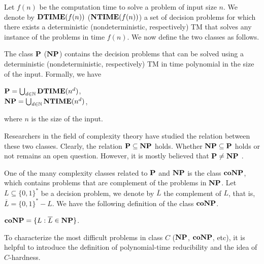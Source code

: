 Let $f(n)$ be the computation time to solve a problem of input size $n$.
We denote by $\textbf{DTIME}(f(n))$ ($\textbf{NTIME}(f(n))$) a set of decision problems 
for which there exists a deterministic (nondeterministic, respectively) TM
that solves any instance of the problems in time $f(n)$.
We now define the two classes as follows.

\begin{definition}
	The class $\textbf{P}$ ($\textbf{NP}$) contains the decision problems that can be solved using a 
	deterministic (nondeterministic, respectively) TM 
	in time polynomial in the size of the input.  Formally, we have
	\begin{center}
		$\textbf{P} = \bigcup_{d \in \mathbb{N}} \textbf{DTIME}(n^d)$,\\
		$\textbf{NP} = \bigcup_{d \in \mathbb{N}} \textbf{NTIME}(n^d)$,
	\end{center}
	where $n$ is the size of the input.
\end{definition}

Researchers in the field of complexity theory have studied
the relation between these two classes.
Clearly, the relation $\textbf{P} \subseteq \textbf{NP}$ holds. Whether
$\textbf{NP} \subseteq \textbf{P}$ holds or not remains an open question.
However, it is mostly believed that $\textbf{P} \not = \textbf{NP}$ \cite{gasarch2002p}. 


One of the many complexity classes related to $\textbf{P}$ and $\textbf{NP}$ \cite{gasarch2002p}
is the class $\textbf{coNP}$, which contains problems that are complement of 
the problems in $\textbf{NP}$.
Let $L \subseteq \{0,1\}^*$ be a decision problem, we denote by $\overline{L}$ the
complement of $L$, that is, $\overline{L} = \{0,1\}^*-L$.
We have the following definition of the class $\textbf{coNP}$.

\begin{definition}
	$\textbf{coNP} = \{L : \overline{L} \in \textbf{NP}\}$.
\end{definition}

To characterize the most difficult problems in class $C$ ($\textbf{NP}$, $\textbf{coNP}$, etc), 
it is helpful to introduce
the definition of polynomial-time reducibility \cite{gasarch2002p} and the 
idea of $C$-hardness.


